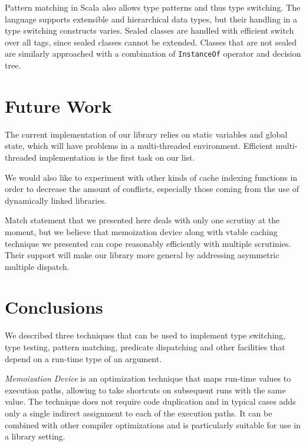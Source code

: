 \documentclass[preprint]{sigplanconf}
\makeatletter
\DeclareRobustCommand{\code}[1]{{\lstinline[breaklines=false,escapechar=@]{#1}}}
\makeatother
\begin{document}
Pattern matching in Scala\cite{Scala2nd} also allows type patterns and thus type 
switching. The language supports extensible and hierarchical data types, but 
their handling in a type switching constructs varies. Sealed classes are handled 
with efficient switch over all tags, since sealed classes cannot be extended. 
Classes that are not sealed are similarly approached with a combination of 
\code{InstanceOf} operator and decision tree\cite{EmirThesis}.

\section{Future Work} %
\label{sec:fw}

The current implementation of our library relies on static variables and global 
state, which will have problems in a multi-threaded environment. Efficient 
multi-threaded implementation is the first task on our list. 

We would also like to experiment with other kinds of cache indexing functions in 
order to decrease the amount of conflicts, especially those coming from the use 
of dynamically linked libraries.

Match statement that we presented here deals with only one scrutiny at the 
moment, but we believe that memoization device along with vtable caching 
technique we presented can cope reasonably efficiently with multiple scrutinies. 
Their support will make our library more general by addressing asymmetric 
multiple dispatch.

\section{Conclusions} %
\label{sec:cc}

We described three techniques that can be used to implement type switching, type 
testing, pattern matching, predicate dispatching and other facilities that 
depend on a run-time type of an argument.

\emph{Memoization Device} is an optimization technique that maps run-time values 
to execution paths, allowing to take shortcuts on subsequent runs with the same 
value. The technique does not require code duplication and in typical cases adds 
only a single indirect assignment to each of the execution paths. It can be 
combined with other compiler optimizations and is particularly suitable for use 
in a library setting.
\end{document}
